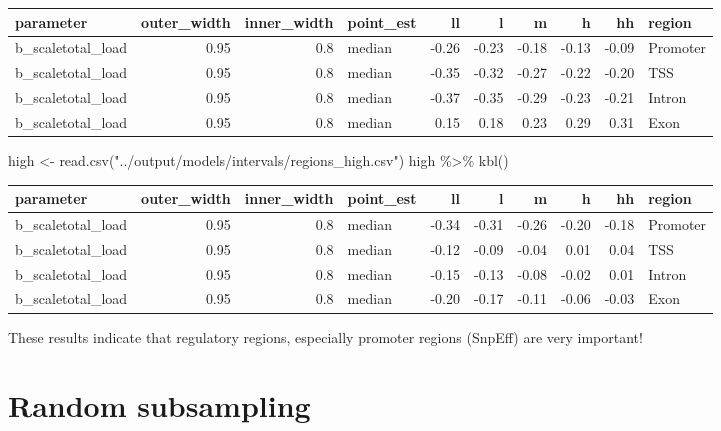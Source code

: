 \documentclass[
  letterpaper,
  DIV=11,
  numbers=noendperiod]{scrreprt}
\newenvironment{Shaded}{}{}
\newcommand{\FunctionTok}[1]{\textcolor[rgb]{0.44,0.26,0.76}{#1}}
\newcommand{\NormalTok}[1]{\textcolor[rgb]{0.14,0.16,0.18}{#1}}
\newcommand{\OtherTok}[1]{\textcolor[rgb]{0.44,0.26,0.76}{#1}}
\newcommand{\SpecialCharTok}[1]{\textcolor[rgb]{0.00,0.36,0.77}{#1}}
\newcommand{\StringTok}[1]{\textcolor[rgb]{0.01,0.18,0.38}{#1}}
\begin{document}
\begin{tabular}[t]{l|r|r|l|r|r|r|r|r|l}
\hline
parameter & outer\_width & inner\_width & point\_est & ll & l & m & h & hh & region\\
\hline
b\_scaletotal\_load & 0.95 & 0.8 & median & -0.26 & -0.23 & -0.18 & -0.13 & -0.09 & Promoter\\
\hline
b\_scaletotal\_load & 0.95 & 0.8 & median & -0.35 & -0.32 & -0.27 & -0.22 & -0.20 & TSS\\
\hline
b\_scaletotal\_load & 0.95 & 0.8 & median & -0.37 & -0.35 & -0.29 & -0.23 & -0.21 & Intron\\
\hline
b\_scaletotal\_load & 0.95 & 0.8 & median & 0.15 & 0.18 & 0.23 & 0.29 & 0.31 & Exon\\
\hline
\end{tabular}

\begin{Shaded}
\begin{Highlighting}[]
\NormalTok{high }\OtherTok{\textless{}{-}} \FunctionTok{read.csv}\NormalTok{(}\StringTok{"../output/models/intervals/regions\_high.csv"}\NormalTok{)}
\NormalTok{high }\SpecialCharTok{\%\textgreater{}\%} \FunctionTok{kbl}\NormalTok{()}
\end{Highlighting}
\end{Shaded}

\begin{tabular}[t]{l|r|r|l|r|r|r|r|r|l}
\hline
parameter & outer\_width & inner\_width & point\_est & ll & l & m & h & hh & region\\
\hline
b\_scaletotal\_load & 0.95 & 0.8 & median & -0.34 & -0.31 & -0.26 & -0.20 & -0.18 & Promoter\\
\hline
b\_scaletotal\_load & 0.95 & 0.8 & median & -0.12 & -0.09 & -0.04 & 0.01 & 0.04 & TSS\\
\hline
b\_scaletotal\_load & 0.95 & 0.8 & median & -0.15 & -0.13 & -0.08 & -0.02 & 0.01 & Intron\\
\hline
b\_scaletotal\_load & 0.95 & 0.8 & median & -0.20 & -0.17 & -0.11 & -0.06 & -0.03 & Exon\\
\hline
\end{tabular}

These results indicate that regulatory regions, especially promoter
regions (SnpEff) are very important!


\hypertarget{random-subsampling}{%
\chapter{Random subsampling}\label{random-subsampling}}
\end{document}
